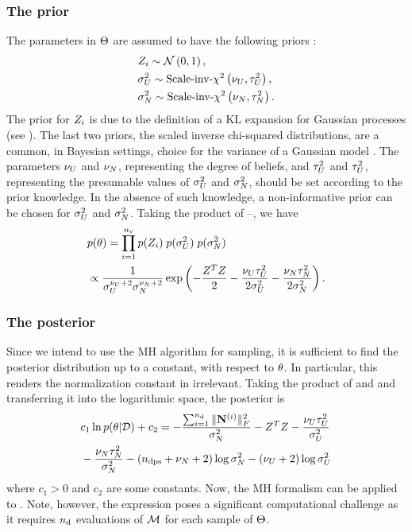 \subsubsection{The prior}
The parameters in $\Theta$ are assumed to have the following priors \cite{marzouk2009}:
\begin{align}
  & \Z_i \sim \gaussian{0}{1}, \elabel{z-prior} \\
  & \sigma^2_\U \sim \sichisquared{\nu_\U}{\tau^2_\U}, \elabel{sigma2-u-prior}\\
  & \sigma^2_\noise \sim \sichisquared{\nu_\noise}{\tau^2_\noise}. \elabel{sigma2-noise-prior}
\end{align}
The prior for $Z_i$ is due to the definition of a KL expansion for Gaussian processes (see ). The last two priors, the scaled inverse chi-squared distributions, are a common, in Bayesian settings, choice for the variance of a Gaussian model \cite{gelman2004}. The parameters $\nu_U$ and $\nu_N$, representing the degree of beliefs, and $\tau^2_U$ and $\tau^2_U$, representing the presumable values of $\sigma^2_U$ and $\sigma^2_N$, should be set according to the prior knowledge. In the absence of such knowledge, a non-informative prior can be chosen for $\sigma^2_U$ and $\sigma^2_N$. Taking the product of --, we have
\begin{align}
  & \f{\param} = \prod_{i = 1}^\nvars \f{\Z_i} \; \f{\sigma^2_\U} \; \f{\sigma^2_\noise} \elabel{prior} \\
  & \propto \frac{1}{\sigma_\U^{\nu_\U + 2} \sigma_\noise^{\nu_\noise + 2}} \exp\left( -\frac{\vZ^T\vZ}{2} -\frac{\nu_\U \tau_\U^2}{2 \sigma^2_\U} - \frac{\nu_\noise \tau_\noise^2}{2 \sigma^2_\noise} \right). \nonumber
\end{align}

\subsubsection{The posterior}
Since we intend to use the MH algorithm for sampling, it is sufficient to find the posterior distribution up to a constant, with respect to $\theta$. In particular, this renders the normalization constant in  irrelevant. Taking the product of  and  and transferring it into the logarithmic space, the posterior is
\begin{align}
  & c_1 \ln \f{\param | \data} + c_2 = -\frac{\sum_{i = 1}^\ndata \fnorm{\mnoise^{(i)}}^2}{\sigma^2_\noise} - \vZ^T\vZ - \frac{\nu_\U \tau_\U^2}{\sigma^2_\U}  \elabel{log-posterior} \\
  & {} - \frac{\nu_\noise \tau_\noise^2}{\sigma^2_\noise} -(\ndcs + \nu_\noise + 2) \log \sigma^2_\noise - (\nu_\U + 2) \log \sigma^2_\U \nonumber
\end{align}
where $c_1 > 0$ and $c_2$ are some constants. Now, the MH formalism can be applied to . Note, however, the expression poses a significant computational challenge as it requires ${n_\text{d}}$ evaluations of $\model$ for each sample of $\Theta$.
